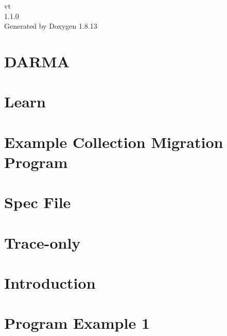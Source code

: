 \documentclass[twoside]{book}
\newcommand{\+}{\discretionary{\mbox{\scriptsize$\hookleftarrow$}}{}{}}
\newcommand{\clearemptydoublepage}{%
  \newpage{\pagestyle{empty}\cleardoublepage}%
}
\begin{document}
\hypersetup{pageanchor=false,
             bookmarksnumbered=true,
             pdfencoding=unicode
            }
\begin{titlepage}
\vspace*{7cm}
\begin{center}%
{\Large vt \\[1ex]\large 1.\+1.\+0 }\\
\vspace*{1cm}
{\large Generated by Doxygen 1.8.13}\\
\end{center}
\end{titlepage}
\clearemptydoublepage
{}
\tableofcontents
\clearemptydoublepage
{}
\hypersetup{pageanchor=true}

\chapter{D\+A\+R\+MA}
\label{index}\hypertarget{index}{}
\chapter{Learn}
\label{learn}

\chapter{Example Collection Migration Program}
\label{migrate-collection-example}

\chapter{Spec File}
\label{spec-file}

\chapter{Trace-\/only}
\label{trace-only}

\chapter{Introduction}
\label{introduction}

\chapter{Program Example 1}
\label{ckpt_learn_ex1}

\end{document}

